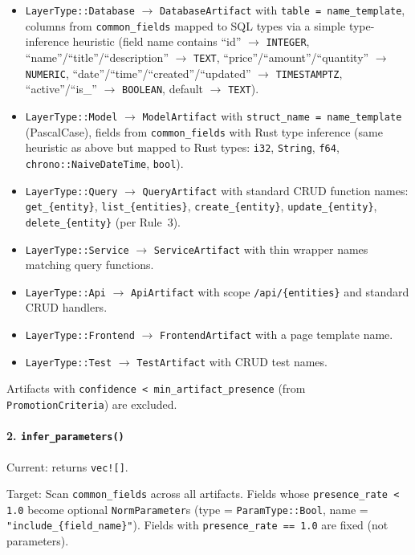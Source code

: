 \documentclass[11pt,a4paper]{article}
\begin{document}
\begin{itemize}[nosep]
\item \texttt{LayerType::Database} $\to$ \texttt{DatabaseArtifact} with 
      \texttt{table = name\_template}, columns from \texttt{common\_fields} 
      mapped to SQL types via a simple type-inference heuristic 
      (field name contains ``id'' $\to$ \texttt{INTEGER}, 
      ``name''/``title''/``description'' $\to$ \texttt{TEXT}, 
      ``price''/``amount''/``quantity'' $\to$ \texttt{NUMERIC}, 
      ``date''/``time''/``created''/``updated'' $\to$ \texttt{TIMESTAMPTZ}, 
      ``active''/``is\_'' $\to$ \texttt{BOOLEAN}, 
      default $\to$ \texttt{TEXT}).
\item \texttt{LayerType::Model} $\to$ \texttt{ModelArtifact} with 
      \texttt{struct\_name = name\_template} (PascalCase), fields from 
      \texttt{common\_fields} with Rust type inference 
      (same heuristic as above but mapped to Rust types: \texttt{i32}, 
      \texttt{String}, \texttt{f64}, \texttt{chrono::NaiveDateTime}, 
      \texttt{bool}).
\item \texttt{LayerType::Query} $\to$ \texttt{QueryArtifact} with 
      standard CRUD function names: 
      \texttt{get\_\{entity\}}, \texttt{list\_\{entities\}}, 
      \texttt{create\_\{entity\}}, \texttt{update\_\{entity\}}, 
      \texttt{delete\_\{entity\}} (per Rule~3).
\item \texttt{LayerType::Service} $\to$ \texttt{ServiceArtifact} with 
      thin wrapper names matching query functions.
\item \texttt{LayerType::Api} $\to$ \texttt{ApiArtifact} with scope 
      \texttt{/api/\{entities\}} and standard CRUD handlers.
\item \texttt{LayerType::Frontend} $\to$ \texttt{FrontendArtifact} with 
      a page template name.
\item \texttt{LayerType::Test} $\to$ \texttt{TestArtifact} with CRUD 
      test names.
\end{itemize}

Artifacts with \texttt{confidence < min\_artifact\_presence} (from 
\texttt{PromotionCriteria}) are excluded.

\paragraph{2. \texttt{infer\_parameters()}}

Current: returns \texttt{vec![]}.

Target: Scan \texttt{common\_fields} across all artifacts. Fields 
whose \texttt{presence\_rate < 1.0} become optional 
\texttt{NormParameter}s (type = \texttt{ParamType::Bool}, name = 
\texttt{"include\_\{field\_name\}"}). Fields with \texttt{presence\_rate 
== 1.0} are fixed (not parameters).
\end{document}
